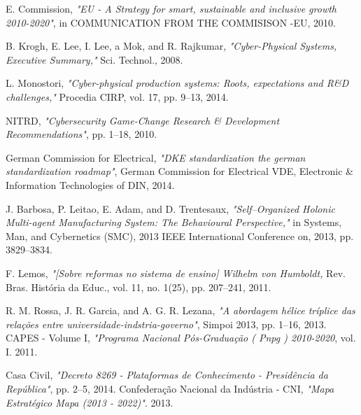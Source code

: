 \documentclass[10pt,letterpaper,twocolumn]{IEEEtran}
\begin{document}
\begin{thebibliography}{99}
	E. Commission, 
	\emph{"EU - A Strategy for smart, sustainable and inclusive growth 2010-2020"}, in COMMUNICATION FROM THE COMMISISON -EU, 2010.

	 B. Krogh, E. Lee, I. Lee, a Mok, and R. Rajkumar, 
	\emph{"Cyber-Physical Systems, Executive Summary,"} Sci. Technol., 2008.

	 L. Monostori, 
	\emph{"Cyber-physical production systems: Roots, expectations and R\&D challenges,"} Procedia CIRP, vol. 17, pp. 9--13, 2014.

NITRD, 
\emph{"Cybersecurity Game-Change Research \& Development Recommendations"},  pp. 1--18, 2010.

			
	German Commission for Electrical,
	\emph{"DKE standardization the german standardization roadmap"}, German Commission for Electrical VDE, Electronic \& Information Technologies of DIN, 2014.					
					
		
		J. Barbosa, P. Leitao, E. Adam, and D. Trentesaux, \emph{ "Self--Organized Holonic Multi-agent Manufacturing System: The Behavioural Perspective,"} in Systems, Man, and Cybernetics (SMC), 2013 IEEE International Conference on, 2013, pp. 3829--3834.


F. Lemos, 
\emph{"[Sobre reformas no sistema de ensino] Wilhelm von Humboldt,} Rev. Bras. História da Educ., vol. 11, no. 1(25), pp. 207--241, 2011.


R. M. Rossa, J. R. Garcia, and A. G. R. Lezana, 
\emph{"A abordagem hélice tríplice das relações entre universidade-indstria-governo"},  Simpoi 2013, pp. 1--16, 2013.	
CAPES - Volume I, 
\emph{"Programa Nacional Pós-Graduação ( Pnpg ) 2010-2020}, vol. I. 2011.

	Casa Civil, 
\emph{"Decreto 8269 - Plataformas de Conhecimento - Presidência da República"}, pp. 2--5, 2014.
Confederação Nacional da Indústria - CNI,
\emph{"Mapa Estratégico Mapa (2013 - 2022)"}. 2013.


\end{thebibliography}
\end{document}
